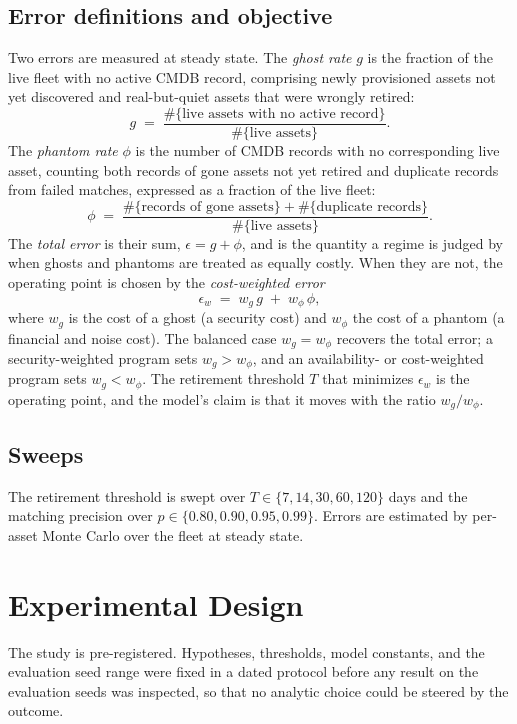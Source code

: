 \documentclass[journal]{IEEEtran}
\begin{document}
\subsection{Error definitions and objective}
Two errors are measured at steady state. The \emph{ghost rate} $g$ is the fraction of the live fleet
with no active CMDB record, comprising newly provisioned assets not yet discovered and
real-but-quiet assets that were wrongly retired:
\begin{equation}
g \;=\; \frac{\#\{\text{live assets with no active record}\}}{\#\{\text{live assets}\}}.
\label{eq:ghost}
\end{equation}
The \emph{phantom rate} $\phi$ is the number of CMDB records with no corresponding live asset,
counting both records of gone assets not yet retired and duplicate records from failed matches,
expressed as a fraction of the live fleet:
\begin{equation}
\phi \;=\; \frac{\#\{\text{records of gone assets}\} + \#\{\text{duplicate records}\}}{\#\{\text{live assets}\}}.
\label{eq:phantom}
\end{equation}
The \emph{total error} is their sum, $\epsilon = g + \phi$, and is the quantity a regime is judged
by when ghosts and phantoms are treated as equally costly. When they are not, the operating point is
chosen by the \emph{cost-weighted error}
\begin{equation}
\epsilon_w \;=\; w_g \, g \;+\; w_\phi \, \phi,
\label{eq:costweighted}
\end{equation}
where $w_g$ is the cost of a ghost (a security cost) and $w_\phi$ the cost of a phantom (a financial
and noise cost). The balanced case $w_g = w_\phi$ recovers the total error; a security-weighted
program sets $w_g > w_\phi$, and an availability- or cost-weighted program sets $w_g < w_\phi$. The
retirement threshold $T$ that minimizes $\epsilon_w$ is the operating point, and the model's claim is
that it moves with the ratio $w_g / w_\phi$.

\subsection{Sweeps}
The retirement threshold is swept over $T \in \{7, 14, 30, 60, 120\}$ days and the matching precision
over $p \in \{0.80, 0.90, 0.95, 0.99\}$. Errors are estimated by per-asset Monte Carlo over the
fleet at steady state.

\section{Experimental Design}
The study is pre-registered. Hypotheses, thresholds, model constants, and the evaluation seed range
were fixed in a dated protocol before any result on the evaluation seeds was inspected, so that no
analytic choice could be steered by the outcome.
\end{document}
